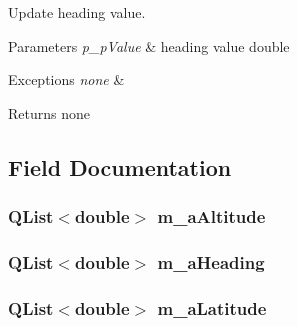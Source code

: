 Update heading value. 


\begin{DoxyParams}{Parameters}
{\em p\-\_\-p\-Value} & heading value double \\
\hline
\end{DoxyParams}

\begin{DoxyExceptions}{Exceptions}
{\em none} & \\
\hline
\end{DoxyExceptions}
\begin{DoxyReturn}{Returns}
none 
\end{DoxyReturn}


\subsection{Field Documentation}
\hypertarget{a00007_a9d1929fdd4a8b1a587c97688bc91037b}{
\subsubsection[{m\-\_\-a\-Altitude}]{\setlength{\rightskip}{0pt plus 5cm}Q\-List$<$double$>$ m\-\_\-a\-Altitude\hspace{0.3cm}{\ttfamily [private]}}}\label{a00007_a9d1929fdd4a8b1a587c97688bc91037b}
\hypertarget{a00007_a9eed7e988005e7291b4e9d401c678693}{
\subsubsection[{m\-\_\-a\-Heading}]{\setlength{\rightskip}{0pt plus 5cm}Q\-List$<$double$>$ m\-\_\-a\-Heading\hspace{0.3cm}{\ttfamily [private]}}}\label{a00007_a9eed7e988005e7291b4e9d401c678693}
\hypertarget{a00007_a684fa381f2a0f0098edcbc7c7b3ea93d}{
\subsubsection[{m\-\_\-a\-Latitude}]{\setlength{\rightskip}{0pt plus 5cm}Q\-List$<$double$>$ m\-\_\-a\-Latitude\hspace{0.3cm}{\ttfamily [private]}}}\label{a00007_a684fa381f2a0f0098edcbc7c7b3ea93d}
